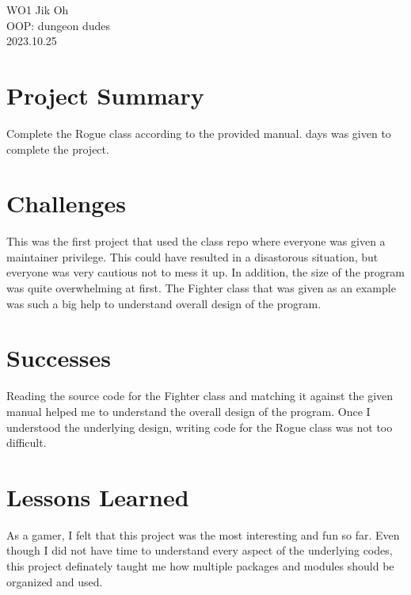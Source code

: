\documentclass[12pt]{article} %
\begin{document}
\begin{flushright}
        WO1 Jik Oh\\
        OOP: dungeon dudes\\
        2023.10.25\\
\end{flushright}

\section*{Project Summary}

Complete the Rogue class according to the provided manual. 
\newline\newline{} days was given to complete the project.

\section*{Challenges}

This was the first project that used the class repo where everyone was given a maintainer privilege. This could have resulted in a disastorous situation, but everyone was very cautious not to mess it up. In addition, the size of the program was quite overwhelming at first. The Fighter class that was given as an example was such a big help to understand overall design of the program. 

\section*{Successes}

Reading the source code for the Fighter class and matching it against the given manual helped me to understand the overall design of the program. Once I understood the underlying design, writing code for the Rogue class was not too difficult. 

\section*{Lessons Learned}

As a gamer, I felt that this project was the most interesting and fun so far. Even though I did not have time to understand every aspect of the underlying codes, this project definately taught me how multiple packages and modules should be organized and used. 
\end{document}
